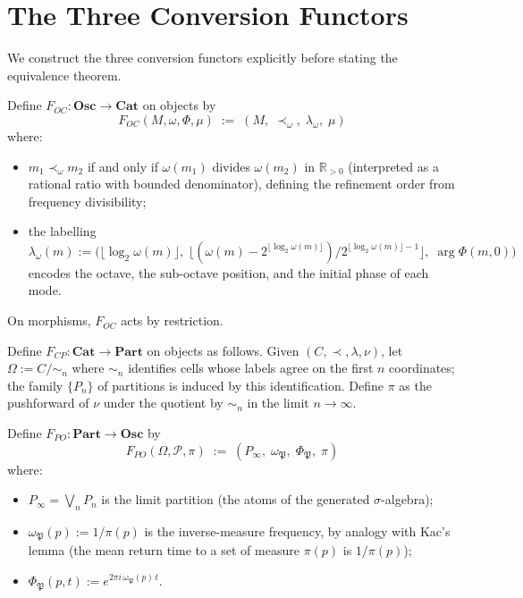 \section{The Three Conversion Functors}
\label{sec:ch15-functors}

We construct the three conversion functors explicitly before stating the
equivalence theorem.

\begin{definition}
\label{def:F-OC}
Define $F_{OC} : \mathbf{Osc} \to \mathbf{Cat}$ on objects by
\[
  F_{OC}(M, \omega, \Phi, \mu)
  \;:=\; (M,\; \prec_\omega,\; \lambda_\omega,\; \mu)
\]
where:
\begin{itemize}[noitemsep]
  \item $m_1 \prec_\omega m_2$ if and only if $\omega(m_1)$ divides
    $\omega(m_2)$ in $\mathbb{R}_{>0}$ (interpreted as a rational ratio with
    bounded denominator), defining the refinement order from frequency
    divisibility;
  \item the labelling
    $\lambda_\omega(m) :=
    \bigl(\lfloor\log_2 \omega(m)\rfloor,\;
     \lfloor(\omega(m) - 2^{\lfloor\log_2\omega(m)\rfloor})/
            2^{\lfloor\log_2\omega(m)\rfloor - 1}\rfloor,\;
     \arg\Phi(m,0)\bigr)$
    encodes the octave, the sub-octave position, and the initial phase of
    each mode.
\end{itemize}
On morphisms, $F_{OC}$ acts by restriction.
\end{definition}

\begin{definition}
\label{def:F-CP}
Define $F_{CP} : \mathbf{Cat} \to \mathbf{Part}$ on objects as follows.
Given $(C, \prec, \lambda, \nu)$, let $\Omega := C / {\sim_n}$ where
${\sim_n}$ identifies cells whose labels agree on the first $n$ coordinates;
the family $\{P_n\}$ of partitions is induced by this identification.
Define $\pi$ as the pushforward of $\nu$ under the quotient by ${\sim_n}$ in
the limit $n \to \infty$.
\end{definition}

\begin{definition}
\label{def:F-PO}
Define $F_{PO} : \mathbf{Part} \to \mathbf{Osc}$ by
\[
  F_{PO}(\Omega, \mathscr{P}, \pi)
  \;:=\; (P_\infty,\; \omega_{\mathfrak{P}},\; \Phi_{\mathfrak{P}},\; \pi)
\]
where:
\begin{itemize}[noitemsep]
  \item $P_\infty = \bigvee_n P_n$ is the limit partition (the atoms of the
    generated $\sigma$-algebra);
  \item $\omega_{\mathfrak{P}}(p) := 1/\pi(p)$ is the inverse-measure
    frequency, by analogy with Kac's lemma (the mean return time to a set
    of measure $\pi(p)$ is $1/\pi(p)$);
  \item $\Phi_{\mathfrak{P}}(p, t) := e^{2\pi i\,\omega_{\mathfrak{P}}(p)\,t}$.
\end{itemize}
\end{definition}

